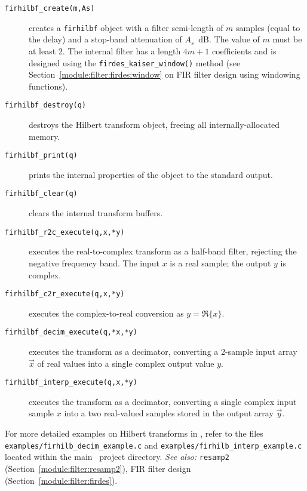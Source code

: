 \begin{description}
\item[{\tt firhilbf\_create(m,As)}]
    creates a {\tt firhilbf} object with a filter semi-length of $m$
    samples (equal to the delay)
    and a stop-band attenuation of $A_s$~dB.
    The value of $m$ must be at least 2.
    The internal filter has a length $4m+1$ coefficients and is designed
    using the {\tt firdes\_kaiser\_window()} method
    (see Section~\ref{module:filter:firdes:window} on FIR filter design
    using windowing functions).
\item[{\tt firhilbf\_destroy(q)}]
    destroys the Hilbert transform object, freeing all
    internally-allocated memory.
\item[{\tt firhilbf\_print(q)}]
    prints the internal properties of the object to the standard
    output.
\item[{\tt firhilbf\_clear(q)}]
    clears the internal transform buffers.
\item[{\tt firhilbf\_r2c\_execute(q,x,*y)}]
    executes the real-to-complex transform as a half-band filter,
    rejecting the negative frequency band.
    The input $x$ is a real sample;
    the output $y$ is complex.
\item[{\tt firhilbf\_c2r\_execute(q,x,*y)}]
    executes the complex-to-real conversion as $y = \Re\{x\}$.
\item[{\tt firhilbf\_decim\_execute(q,*x,*y)}]
    executes the transform as a decimator, converting a 2-sample input
    array $\vec{x}$ of real values into a single complex output value
    $y$.
\item[{\tt firhilbf\_interp\_execute(q,x,*y)}]
    executes the transform as a decimator, converting a single complex
    input sample $x$ into a two real-valued samples stored in the output
    array $\vec{y}$.
\end{description}
%
For more detailed examples on Hilbert transforms in \liquid,
refer to the files
{\tt examples/firhilb\_decim\_example.c} and
{\tt examples/firhilb\_interp\_example.c}
located within the main \liquid\ project directory.
%
{\it See also:} {\tt resamp2} (Section~\ref{module:filter:resamp2}),
FIR filter design (Section~\ref{module:filter:firdes}).



% 
%
